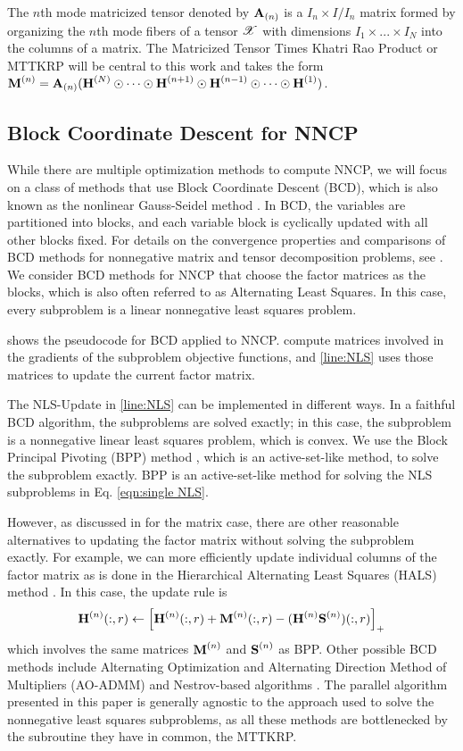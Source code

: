 The $n$th mode matricized tensor denoted by $\M{A}_{(n)}$ is a $I_n\times I/I_n$ matrix formed by organizing the $n$th mode fibers of a tensor $\T{X}$ with dimensions $I_{1} \times ... \times I_{N}$ into the columns of a matrix. 
The Matricized Tensor Times Khatri Rao Product or MTTKRP will be central to this work and takes the form $\Mn{M}{n} = \Mz{A}{n}( \Mn{H}{N} \Khat \cdots \Khat \Mn{H}{n+1} \Khat \Mn{H}{n-1} \Khat  \cdots \Khat \Mn{H}{1})$. 

\subsection {Block Coordinate Descent for NNCP}

While there are multiple optimization methods to compute NNCP, we will focus on a class of methods that use Block Coordinate Descent (BCD), which is also known as the nonlinear Gauss-Seidel method \cite{Bertsekas1999}.
In BCD, the variables are partitioned into blocks, and each variable block is cyclically updated with all other blocks fixed.
For details on the convergence properties and comparisons of BCD methods for nonnegative matrix and tensor decomposition problems, see \cite{KHP2014}.
We consider BCD methods for NNCP that choose the factor matrices as the blocks, which is also often referred to as Alternating Least Squares.
In this case, every subproblem is a linear nonnegative least squares problem.

 shows the pseudocode for BCD applied to NNCP.
 compute matrices involved in the gradients of the subproblem objective functions, and \cref{line:NLS} uses those matrices to update the current factor matrix.

The NLS-Update in \cref{line:NLS} can be implemented in different ways.
In a faithful BCD algorithm, the subproblems are solved exactly; in this case, the subproblem is a nonnegative linear least squares problem, which is convex.
We use the Block Principal Pivoting (BPP) method \cite{KP2011,KHP2014}, which is an active-set-like method, to solve the subproblem exactly.
BPP is an active-set-like method for solving the NLS subproblems in Eq. \eqref{eqn:single NLS}.

However, as discussed in \cite{KBP2018} for the matrix case, there are other reasonable alternatives to updating the factor matrix without solving the subproblem exactly.
For example, we can more efficiently update individual columns of the factor matrix as is done in the Hierarchical Alternating Least Squares (HALS) method \cite{CP2009}.
In this case, the update rule is 
$$\Mn{H}{n}(:,r) \leftarrow \lt[ \Mn{H}{n}(:,r) + \Mn{M}{n}(:,r) - (\Mn{H}{n} \Mn{S}{n})(:,r)  \rt]_+$$
which involves the same matrices $\Mn{M}{n}$ and $\Mn{S}{n}$ as BPP.
Other possible BCD methods include Alternating Optimization and Alternating Direction Method of Multipliers (AO-ADMM) \cite{HSL2015, SBK2017} and Nestrov-based algorithms \cite{LKLHS2017}.
The parallel algorithm presented in this paper is generally agnostic to the approach used to solve the nonnegative least squares subproblems, as all these methods are bottlenecked by the subroutine they have in common, the MTTKRP. 


